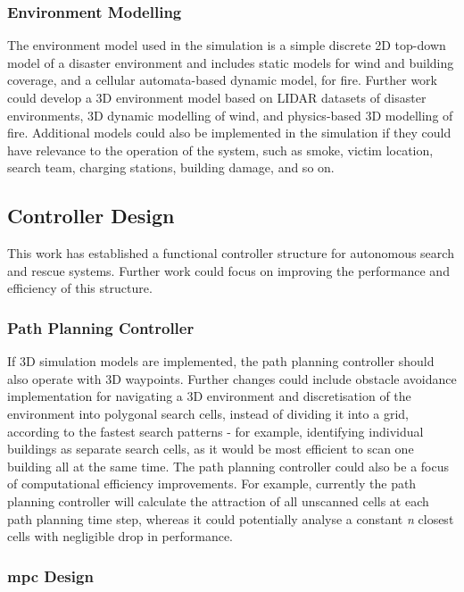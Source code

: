 \documentclass[conference]{IEEEtran}
\begin{document}
\subsubsection{Environment Modelling}
The environment model used in the simulation is a simple discrete 2D top-down model of a disaster environment and includes static models for wind and building coverage, and a cellular automata-based dynamic model, for fire.
Further work could develop a 3D environment model based on LIDAR datasets of disaster environments, 3D dynamic modelling of wind, and physics-based 3D modelling of fire.
Additional models could also be implemented in the simulation if they could have relevance to the operation of the system, such as smoke, victim location, search team, charging stations, building damage, and so on.

\subsection{Controller Design}

This work has established a functional controller structure for autonomous search and rescue systems.
Further work could focus on improving the performance and efficiency of this structure.

\subsubsection{Path Planning Controller}
If 3D simulation models are implemented, the path planning controller should also operate with 3D waypoints.
Further changes could include obstacle avoidance implementation for navigating a 3D environment and discretisation of the environment into polygonal search cells, instead of dividing it into a grid, according to the fastest search patterns - for example, identifying individual buildings as separate search cells, as it would be most efficient to scan one building all at the same time.
The path planning controller could also be a focus of computational efficiency improvements.
For example, currently the path planning controller will calculate the attraction of all unscanned cells at each path planning time step, whereas it could potentially analyse a constant \textit{n} closest cells with negligible drop in performance.

\subsubsection{\gls{mpc} Design}
\end{document}

